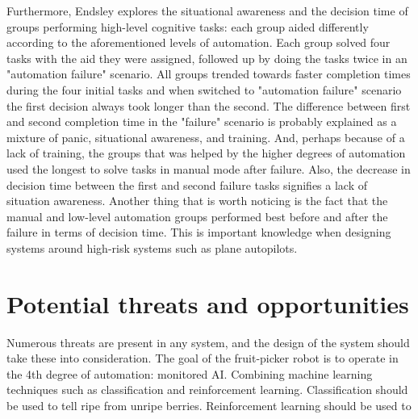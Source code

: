 \documentclass[%
oneside,    %
project,    %
nosummary   %
]{USN-MSc}
\begin{document}
Furthermore, Endsley \cite{article} explores the situational awareness and the decision time of groups performing high-level cognitive tasks: each group aided differently according to the aforementioned levels of automation. Each group solved four tasks with the aid they were assigned, followed up by doing the tasks twice in an "automation failure" scenario. All groups trended towards faster completion times during the four initial tasks and when switched to "automation failure" scenario the first decision always took longer than the second. The difference between first and second completion time in the "failure" scenario is probably explained as a mixture of panic, situational awareness, and training. And, perhaps because of a lack of training, the groups that was helped by the higher degrees of automation used the longest to solve tasks in manual mode after failure. Also, the decrease in decision time between the first and second failure tasks signifies a lack of situation awareness. Another thing that is worth noticing is the fact that the manual and low-level automation groups performed best before and after the failure in terms of decision time. This is important knowledge when designing systems around high-risk systems such as plane autopilots.

\section{Potential threats and opportunities}
\label{sec:threatsOpportunities}

Numerous threats are present in any system, and the design of the system should take these into consideration. The goal of the fruit-picker robot is to operate in the 4th degree of automation: monitored AI. Combining machine learning techniques such as classification and reinforcement learning. Classification should be used to tell ripe from unripe berries. Reinforcement learning should be used to 

~\nocite{*}

\cleardoublepage

\printbibliography[heading=bibintoc, title={References}]


\end{document}
